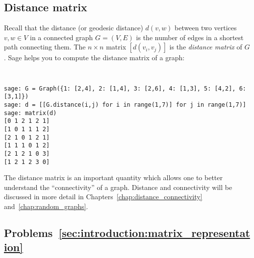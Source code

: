 
\subsection{Distance matrix}

Recall that the distance (or geodesic distance) $d(v,w)$ between two
vertices $v,w \in V$ in a connected graph $G = (V,E)$ is the number of
edges in a shortest path connecting them. The $n \times n$ matrix
$[d(v_i, v_j)]$ is the \emph{distance matrix} of $G$. Sage helps you
to compute the distance matrix of a graph:
%
\begin{center}
\fontsize{9pt}{9pt}
\selectfont
\tt
\begin{lstlisting}
sage: G = Graph({1: [2,4], 2: [1,4], 3: [2,6], 4: [1,3], 5: [4,2], 6: [3,1]})
sage: d = [[G.distance(i,j) for i in range(1,7)] for j in range(1,7)]
sage: matrix(d)
[0 1 2 1 2 1]
[1 0 1 1 1 2]
[2 1 0 1 2 1]
[1 1 1 0 1 2]
[2 1 2 1 0 3]
[1 2 1 2 3 0]
\end{lstlisting}
\end{center}

The distance matrix is an important quantity which allows one to
better understand the ``connectivity'' of a graph. Distance and
connectivity will be discussed in more detail in
Chapters~\ref{chap:distance_connectivity}
and~\ref{chap:random_graphs}.



\subsection*{Problems~\ref{sec:introduction:matrix_representation}}

